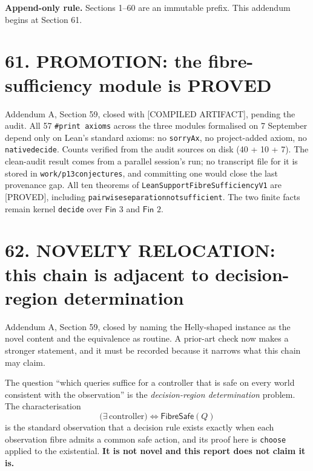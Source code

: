 \documentclass[9pt,twocolumn]{article}
\newcommand{\eclass}[1]{\textsf{[#1]}}
\renewcommand{\_}{\CIGunderscore\allowbreak}
\begin{document}
\sloppy
{}

\textbf{Append-only rule.} Sections 1--60 are an immutable prefix. This addendum begins at Section 61.

\section*{61. PROMOTION: the fibre-sufficiency module is PROVED}
Addendum A, Section 59, closed with \eclass{COMPILED ARTIFACT}, pending the audit. All 57 \texttt{\#print axioms} across the three modules formalised on 7 September depend only on Lean's standard axioms: no \texttt{sorryAx}, no project-added axiom, no \texttt{native\_decide}. Counts verified from the audit sources on disk (40 + 10 + 7). The clean-audit result comes from a parallel session's run; no transcript file for it is stored in \texttt{work/p13\_conjectures}, and committing one would close the last provenance gap. All ten theorems of \texttt{LeanSupportFibreSufficiencyV1} are \eclass{PROVED}, including \texttt{pairwise\_separation\_not\_sufficient}. The two finite facts remain kernel \texttt{decide} over $\textsf{Fin }3$ and $\textsf{Fin }2$.

\section*{62. NOVELTY RELOCATION: this chain is adjacent to decision-region determination}
Addendum A, Section 59, closed by naming the Helly-shaped instance as the novel content and the equivalence as routine. A prior-art check now makes a stronger statement, and it must be recorded because it narrows what this chain may claim.

The question ``which queries suffice for a controller that is safe on every world consistent with the observation'' is the \emph{decision-region determination} problem. The characterisation
\[\bigl(\exists\,\text{controller}\bigr)\iff\textsf{FibreSafe}(Q)\]
is the standard observation that a decision rule exists exactly when each observation fibre admits a common safe action, and its proof here is \texttt{choose} applied to the existential. \textbf{It is not novel and this report does not claim it is.}
\end{document}
